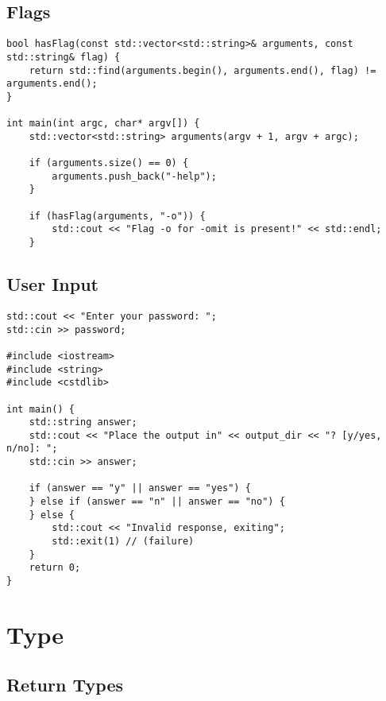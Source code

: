 \subsection{Flags}

\begin{verbatim}
bool hasFlag(const std::vector<std::string>& arguments, const std::string& flag) {
    return std::find(arguments.begin(), arguments.end(), flag) != arguments.end();
}

int main(int argc, char* argv[]) {
    std::vector<std::string> arguments(argv + 1, argv + argc);

    if (arguments.size() == 0) {
        arguments.push_back("-help");
    }

    if (hasFlag(arguments, "-o")) {
        std::cout << "Flag -o for -omit is present!" << std::endl;
    }
\end{verbatim}

\subsection{User Input}

\begin{verbatim}
std::cout << "Enter your password: ";
std::cin >> password;

#include <iostream>
#include <string>
#include <cstdlib>

int main() {
    std::string answer;
    std::cout << "Place the output in" << output_dir << "? [y/yes, n/no]: ";
    std::cin >> answer;

    if (answer == "y" || answer == "yes") {
    } else if (answer == "n" || answer == "no") {
    } else {
        std::cout << "Invalid response, exiting";
        std::exit(1) // (failure)
    }
    return 0;
}
\end{verbatim}



\section{Type}

\subsection{Return Types}

